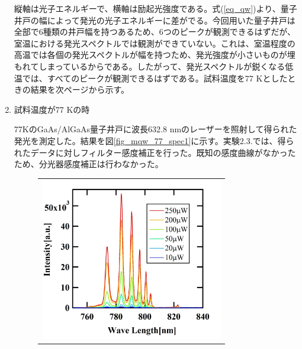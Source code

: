 \documentclass[11pt,a4j]{jsarticle}
\begin{document}
\begin{enumerate}


       \newpage

       縦軸は光子エネルギーで、横軸は励起光強度である。式(\ref{eq_qw})より、量子井戸の幅によって発光の光子エネルギーに差がでる。今回用いた量子井戸は全部で6種類の井戸幅を持つあるため、6つのピークが観測できるはずだが、室温における発光スペクトルでは観測ができていない。これは、室温程度の高温では各個の発光スペクトルが幅を持つため、発光強度が小さいものが埋もれてしまっているからである。したがって、発光スペクトルが鋭くなる低温では、すべてのピークが観測できるはずである。試料温度を77 Kとしたときの結果を次ページから示す。

       \newpage
 \item 試料温度が77 Kの時

       77KのGaAs/AlGaAs量子井戸に波長632.8 nmのレーザーを照射して得られた発光を測定した。結果を図\ref{fig_mqw_77_spec1}に示す。実験2.3.では、得られたデータに対しフィルター感度補正を行った。既知の感度曲線がなかったため、分光器感度補正は行わなかった。


       \begin{figure}[ht]
        \centering
        \begin{tabular}{c}

         \begin{minipage}{0.52\hsize}

          \includegraphics[clip,width=8cm]{start2_MQW_77K_Spectrum_wav.jpg}
         \end{minipage}


\end{tabular}
\end{figure}
\end{enumerate}
\end{document}
